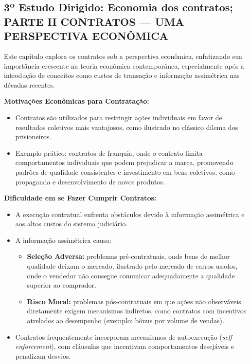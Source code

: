 \documentclass[a4paper,12pt]{article}[abntex2]
\begin{document}
\newpage
\subsection{\textbf{3º Estudo Dirigido: Economia dos contratos; PARTE II CONTRATOS — UMA PERSPECTIVA ECONÔMICA}}

Este capítulo explora os contratos sob a perspectiva econômica, enfatizando sua importância crescente na teoria econômica contemporânea, especialmente após a introdução de conceitos como custos de transação e informação assimétrica nas décadas recentes.

\textbf{Motivações Econômicas para Contratação:}
\begin{itemize}
\item Contratos são utilizados para restringir ações individuais em favor de resultados coletivos mais vantajosos, como ilustrado no clássico dilema dos prisioneiros.
\item Exemplo prático: contratos de franquia, onde o contrato limita comportamentos individuais que podem prejudicar a marca, promovendo padrões de qualidade consistentes e investimento em bens coletivos, como propaganda e desenvolvimento de novos produtos.
\end{itemize}

\textbf{Dificuldade em se Fazer Cumprir Contratos:}
\begin{itemize}
\item A execução contratual enfrenta obstáculos devido à informação assimétrica e aos altos custos do sistema judiciário.
\item A informação assimétrica causa:
    \begin{itemize}
    \item \textbf{Seleção Adversa:} problemas pré-contratuais, onde bens de melhor qualidade deixam o mercado, ilustrado pelo mercado de carros usados, onde o vendedor não consegue comunicar adequadamente a qualidade superior ao comprador.
    \item \textbf{Risco Moral:} problemas pós-contratuais em que ações não observáveis diretamente exigem mecanismos indiretos, como contratos com incentivos atrelados ao desempenho (exemplo: bônus por volume de vendas).
    \end{itemize}
\item Contratos frequentemente incorporam mecanismos de autoexecução (\textit{self-enforcement}), com cláusulas que incentivam comportamentos desejáveis e penalizam desvios.
\end{itemize}
\end{document}
